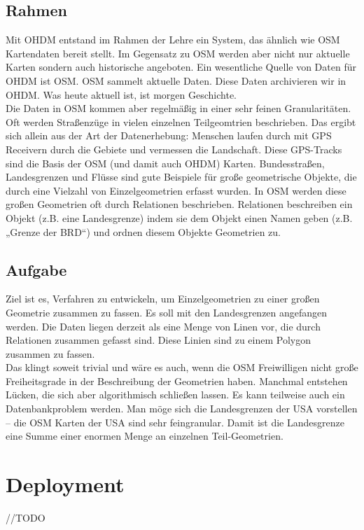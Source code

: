 \documentclass[a4paper, 12pt]{article}
\begin{document}
\subsection{Rahmen}
Mit OHDM entstand im Rahmen der Lehre ein System, das ähnlich wie OSM Kartendaten bereit
stellt. Im Gegensatz zu OSM werden aber nicht nur aktuelle Karten sondern auch historische
angeboten. Ein wesentliche Quelle von Daten für OHDM ist OSM. OSM sammelt aktuelle Daten.
Diese Daten archivieren wir in OHDM. Was heute aktuell ist, ist morgen Geschichte. \\
	\newline
Die Daten in OSM kommen aber regelmäßig in einer sehr feinen Granularitäten. Oft werden
Straßenzüge in vielen einzelnen Teilgeomtrien beschrieben. Das ergibt sich allein aus der Art der
Datenerhebung: Menschen laufen durch mit GPS Receivern durch die Gebiete und vermessen die
Landschaft. Diese GPS-Tracks sind die Basis der OSM (und damit auch OHDM) Karten.
Bundesstraßen, Landesgrenzen und Flüsse sind gute Beispiele für große geometrische Objekte, die
durch eine Vielzahl von Einzelgeometrien erfasst wurden. In OSM werden diese großen Geometrien
oft durch Relationen beschrieben. Relationen beschreiben ein Objekt (z.B. eine Landesgrenze)
indem sie dem Objekt einen Namen geben (z.B. „Grenze der BRD“) und ordnen diesem Objekte Geometrien zu.
	\subsection{Aufgabe}
Ziel ist es, Verfahren zu entwickeln, um Einzelgeometrien zu einer großen Geometrie zusammen zu
fassen. Es soll mit den Landesgrenzen angefangen werden. Die Daten liegen derzeit als eine Menge
von Linen vor, die durch Relationen zusammen gefasst sind. Diese Linien sind zu einem Polygon
zusammen zu fassen.\\
	\newline
Das klingt soweit trivial und wäre es auch, wenn die OSM Freiwilligen nicht große Freiheitsgrade
in der Beschreibung der Geometrien haben. Manchmal entstehen Lücken, die sich aber
algorithmisch schließen lassen. Es kann teilweise auch ein Datenbankproblem werden. Man möge
sich die Landesgrenzen der USA vorstellen – die OSM Karten der USA sind sehr feingranular.
Damit ist die Landesgrenze eine Summe einer enormen Menge an einzelnen Teil-Geometrien\cite{rahmen}.
	\newpage
\section{Deployment}
//TODO 
\end{document}
